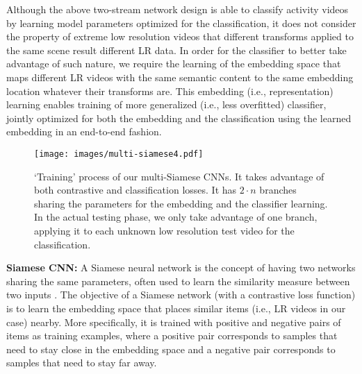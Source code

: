 \documentclass[letterpaper]{article} %
\begin{document}
Although the above two-stream network design is able to classify activity videos by learning model parameters optimized for the classification, it does not consider the property of extreme low resolution videos that different transforms applied to the same scene result different LR data. In order for the classifier to better take advantage of such nature, we require the learning of the embedding space that maps different LR videos with the same semantic content to the same embedding location whatever their transforms are. This embedding (i.e., representation) learning enables training of more generalized (i.e., less overfitted) classifier, jointly optimized for both the embedding and the classification using the learned embedding in an end-to-end fashion.


\begin{figure*}
\begin{center}
   \texttt{[image: images/multi-siamese4.pdf]}
\end{center}
   \caption{`Training' process of our multi-Siamese CNNs. It takes advantage of both contrastive and classification losses. It has $2 \cdot n$ branches sharing the parameters for the embedding and the classifier learning. In the actual testing phase, we only take advantage of one branch, applying it to each unknown low resolution test video for the classification.}
\label{fig:multi-siamese}		
\end{figure*}

{\flushleft\textbf{Siamese CNN:} A Siamese neural network is the concept of having two networks sharing the same parameters, often used to learn the similarity measure between two inputs \cite{hadsell2006dimensionality,bell15siggraph}. The objective of a Siamese network (with a contrastive loss function) is to learn the embedding space that places similar items (i.e., LR videos in our case) nearby. More specifically, it is trained with positive and negative pairs of items as training examples, where a positive pair corresponds to samples that need to stay close in the embedding space and a negative pair corresponds to samples that need to stay far away.}
\end{document}
